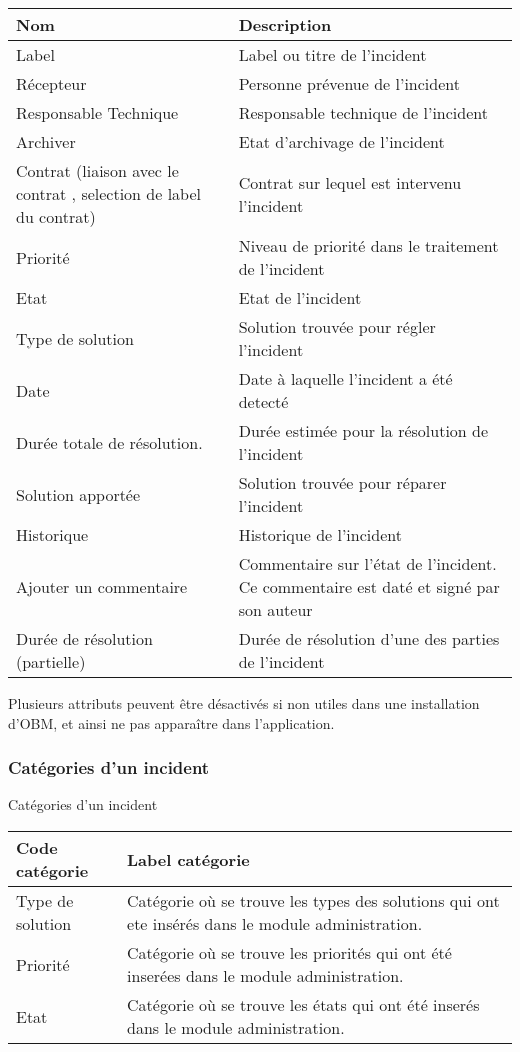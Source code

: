 \begin{tabular}{|p{3cm}|p{10cm}|}
\hline
\textbf{Nom} & \textbf{Description} \\
\hline
Label & Label ou titre de l'incident\\
\hline
Récepteur & Personne prévenue de l'incident\\
\hline
Responsable Technique & Responsable technique de l'incident\\
\hline
Archiver & Etat d'archivage de l'incident\\
\hline
Contrat (liaison avec le contrat , selection de label du contrat) & Contrat sur lequel est intervenu l'incident\\
\hline
Priorité & Niveau de priorité dans le traitement de l'incident\\
\hline
Etat & Etat de l'incident\\
\hline
Type de solution & Solution trouvée pour régler l'incident\\
\hline
Date & Date à laquelle l'incident a été detecté\\
\hline
Durée totale de résolution. & Durée estimée pour la résolution de l'incident\\
\hline
Solution apportée & Solution trouvée pour réparer l'incident\\
\hline
Historique & Historique de l'incident\\
\hline
Ajouter un commentaire & Commentaire sur l'état de l'incident. Ce commentaire est daté et signé par son auteur\\
\hline
Durée de résolution (partielle) & Durée de résolution d'une des parties de l'incident\\
\hline

\end{tabular}
\vspace{0.3cm}


Plusieurs attributs peuvent être désactivés si non utiles dans une installation d'OBM, et ainsi ne pas apparaître dans l'application.\\ 


\subsubsection{Catégories d'un incident}

Catégories d'un incident\\

\begin{tabular}{|p{3cm}|p{10cm}|}
\hline \textbf{Code catégorie} & \textbf{Label catégorie} \\
\hline
Type de solution & Catégorie où se trouve les types des solutions qui ont ete insérés dans le module administration.\\
\hline
Priorité & Catégorie où se trouve les priorités qui ont été inserées dans le module administration.\\
\hline
Etat & Catégorie où se trouve les états qui ont été inserés dans le module administration.\\
\hline
\end{tabular}


